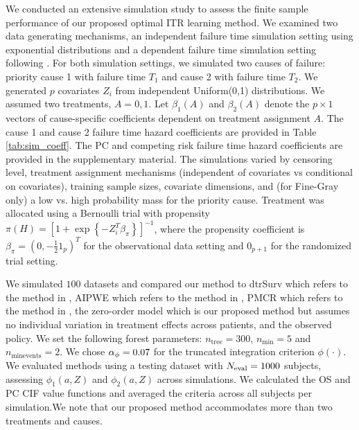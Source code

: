 We conducted an extensive simulation study to assess the finite sample performance of our proposed optimal ITR learning method. We examined two data generating mechanisms, an independent failure time simulation setting using exponential distributions and a dependent failure time simulation setting following \cite{fine_proportional_1999}. For both simulation settings, we simulated two causes of failure: priority cause 1 with failure time $T_1$ and cause 2 with failure time $T_2$. We generated $p$ covariates $Z_i$ from independent Uniform(0,1) distributions. %
We assumed two treatments, $A = 0,1$. Let $\beta_1(A)$ and $\beta_2(A)$ denote the $p\times1$ vectors of cause-specific coefficients dependent on treatment assignment $A$. 
\ifnum{}
\ifnum{}
The cause 1 and cause 2 failure time hazard coefficients are provided in Table \ref{tab:sim_coeff}.
\else
The PC and competing risk failure time hazard coefficients are provided in the supplementary material.
\fi\fi
The simulations varied by censoring level, treatment assignment mechanisms (independent of covariates vs conditional on covariates), training sample sizes, covariate dimensions, and (for Fine-Gray only) a low vs. high probability mass for the priority cause.  Treatment was allocated using a Bernoulli trial with propensity $\pi(H) = \left[1 + \exp\left\{-Z_i^T \beta_\pi\right\}\right]^{-1}$,
where the propensity coefficient is
$\beta_\pi = (0, -\frac{1}{2} 1_p)^T$ for the observational data setting and $0_{p+1}$ for the randomized trial setting.

We simulated $100$ datasets and compared our method to dtrSurv which refers to the method in \cite{cho_multi-stage_2023}, AIPWE which refers to the method in \cite{he_optimal_2021}, PMCR which refers to the method in \cite{zhou_restricted_2021}, the zero-order model which is our proposed method but assumes no individual variation in treatment effects across patients, and the observed policy. We set the following forest parameters: $n_\text{tree} = 300$, $n_\text{min} = 5$ and $n_\text{minevents} = 2$. We chose $\alpha_{\phi} = 0.07$ for the truncated integration criterion $\phi(\cdot)$.%
We evaluated methods using a testing dataset with $N_{\text{eval}} = 1000$ subjects,%
assessing $\phi_1(a,Z)$ and $\phi_2(a,Z)$ across simulations. We calculated the OS and PC CIF value functions and averaged the criteria across all subjects per simulation.We note that our proposed method accommodates more than two treatments and causes. 

